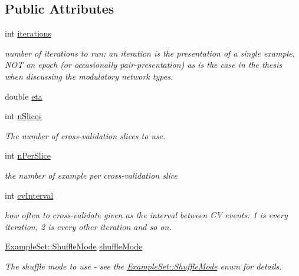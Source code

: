 \subsection*{Public Attributes}
\begin{DoxyCompactItemize}
\item 
int \hyperlink{structNet_1_1SGDParams_a6bcf8009821f63ec9b7564f51cdeb5e9}{iterations}
\begin{DoxyCompactList}\small\item\em number of iterations to run\+: an iteration is the presentation of a single example, N\+OT an epoch (or occasionally pair-\/presentation) as is the case in the thesis when discussing the modulatory network types. \end{DoxyCompactList}\item 
double \hyperlink{structNet_1_1SGDParams_a2a092a8727e9f04f40f9c037b7594e53}{eta}
\item 
int \hyperlink{structNet_1_1SGDParams_ad2881fd1737b7eca70fcc243b3d8f3e1}{n\+Slices}
\begin{DoxyCompactList}\small\item\em The number of cross-\/validation slices to use. \end{DoxyCompactList}\item 
int \hyperlink{structNet_1_1SGDParams_a99878fc2d2ab3a0a70de52d9c04b1a64}{n\+Per\+Slice}
\begin{DoxyCompactList}\small\item\em the number of example per cross-\/validation slice \end{DoxyCompactList}\item 
int \hyperlink{structNet_1_1SGDParams_abef7604394b7eac401efac3075f0445b}{cv\+Interval}
\begin{DoxyCompactList}\small\item\em how often to cross-\/validate given as the interval between CV events\+: 1 is every iteration, 2 is every other iteration and so on. \end{DoxyCompactList}\item 
\hyperlink{classExampleSet_afcdcdbc9a02c53864997e334d8bae33d}{Example\+Set\+::\+Shuffle\+Mode} \hyperlink{structNet_1_1SGDParams_add028f3b43c05649c3fb7dc0fa5f1658}{shuffle\+Mode}
\begin{DoxyCompactList}\small\item\em The shuffle mode to use -\/ see the \hyperlink{classExampleSet_afcdcdbc9a02c53864997e334d8bae33d}{Example\+Set\+::\+Shuffle\+Mode} enum for details. \end{DoxyCompactList}\item 

\end{DoxyCompactItemize}
